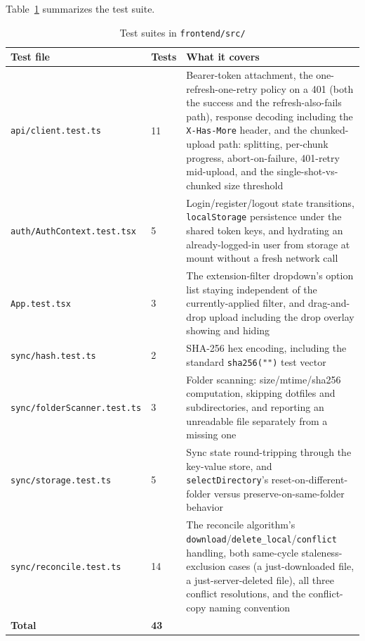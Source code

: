 \documentclass[12pt,a4paper]{article}
\begin{document}
Table~\ref{tab:tests} summarizes the test suite.

\small
\begin{longtable}{@{}p{3.6cm}p{1.1cm}p{10.5cm}@{}}
\caption{Test suites in \texttt{frontend/src/}}
\label{tab:tests} \\
\toprule
\textbf{Test file} & \textbf{Tests} & \textbf{What it covers} \\
\midrule
\endhead
\texttt{api/\allowbreak client.test.ts} & 11 & Bearer-token attachment, the one-refresh-one-retry policy on a 401 (both the success and the refresh-also-fails path), response decoding including the \texttt{X-Has-More} header, and the chunked-upload path: splitting, per-chunk progress, abort-on-failure, 401-retry mid-upload, and the single-shot-vs-chunked size threshold \\
\texttt{auth/\allowbreak AuthContext.\allowbreak test.tsx} & 5 & Login/register/logout state transitions, \texttt{localStorage} persistence under the shared token keys, and hydrating an already-logged-in user from storage at mount without a fresh network call \\
\texttt{App.test.tsx} & 3 & The extension-filter dropdown's option list staying independent of the currently-applied filter, and drag-and-drop upload including the drop overlay showing and hiding \\
\texttt{sync/\allowbreak hash.test.ts} & 2 & SHA-256 hex encoding, including the standard \texttt{sha256("")} test vector \\
\texttt{sync/\allowbreak folderScanner.\allowbreak test.ts} & 3 & Folder scanning: size/mtime/sha256 computation, skipping dotfiles and subdirectories, and reporting an unreadable file separately from a missing one \\
\texttt{sync/\allowbreak storage.test.ts} & 5 & Sync state round-tripping through the key-value store, and \texttt{selectDirectory}'s reset-on-different-folder versus preserve-on-same-folder behavior \\
\texttt{sync/\allowbreak reconcile.\allowbreak test.ts} & 14 & The reconcile algorithm's \texttt{download}/\texttt{delete\_local}/\texttt{conflict} handling, both same-cycle staleness-exclusion cases (a just-downloaded file, a just-server-deleted file), all three conflict resolutions, and the conflict-copy naming convention \\
\bottomrule
\textbf{Total} & \textbf{43} & \\
\end{longtable}
\end{document}
